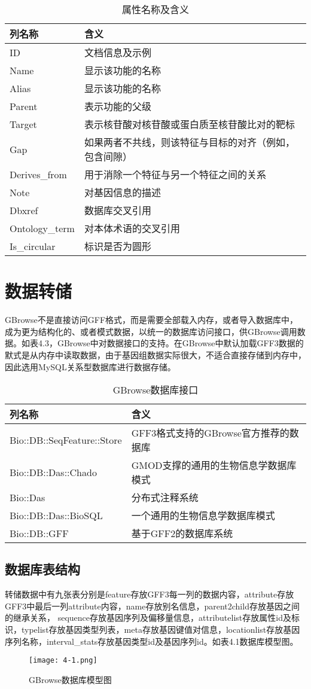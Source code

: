 	\begin{table}[!htbp]
		\centering
		\begin{tabular}{ll}	
			\toprule
			列名称& 含义\\
			\midrule
			ID&文档信息及示例\\
			Name&显示该功能的名称\\
			Alias&显示该功能的名称\\
			Parent&表示功能的父级 \\
			Target&表示核苷酸对核苷酸或蛋白质至核苷酸比对的靶标\\
			Gap&如果两者不共线，则该特征与目标的对齐（例如，包含间隙）\\
			Derives\_from&用于消除一个特征与另一个特征之间的关系\\
			Note&对基因信息的描述\\
			Dbxref&数据库交叉引用\\
			Ontology\_term&对本体术语的交叉引用\\
			Is\_circular&标识是否为圆形\\
			\bottomrule
		\end{tabular}
		\caption{属性名称及含义}
	\end{table}
	\section{数据转储}
	GBrowse不是直接访问GFF格式，而是需要全部载入内存，或者导入数据库中，成为更为结构化的、或者模式数据，以统一的数据库访问接口，供GBrowse调用数据。如表4.3，GBrowse中对数据接口的支持。在GBrowse中默认加载GFF3数据的默式是从内存中读取数据，由于基因组数据实际很大，不适合直接存储到内存中，因此选用MySQL关系型数据库进行数据存储。
	\begin{table}[!htbp]
		\centering
		\begin{tabular}{ll}	
			\toprule
			列名称& 含义\\
			\midrule
			Bio::DB::SeqFeature::Store&GFF3格式支持的GBrowse官方推荐的数据库\\
			Bio::DB::Das::Chado&GMOD支撑的通用的生物信息学数据库模式\\
			Bio::Das&分布式注释系统\\
			Bio::DB::Das::BioSQL&一个通用的生物信息学数据库模式 \\
			Bio::DB::GFF&基于GFF2的数据库系统 \\
			\bottomrule
		\end{tabular}
		\caption{GBrowse数据库接口}
	\end{table}
	\subsection{数据库表结构}
	转储数据中有九张表分别是feature存放GFF3每一列的数据内容，attribute存放GFF3中最后一列attribute内容，name存放别名信息，parent2child存放基因之间的继承关系，
	sequence存放基因序列及偏移量信息，attributelist存放属性id及标识，typelist存放基因类型列表，meta存放基因键值对信息，locationlist存放基因序列名称，interval\_stats存放基因类型id及基因序列id。如表4.1数据库模型图。
	\begin{figure}
		\centering
		\texttt{[image: 4-1.png]}
		\caption{GBrowse数据库模型图}
	\end{figure}
